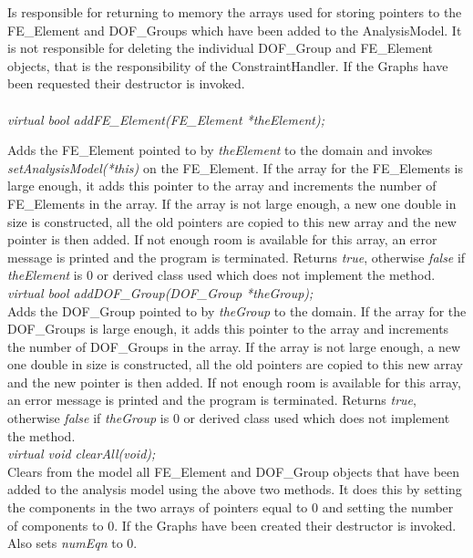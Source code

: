 Is responsible for returning to memory the arrays used for storing
pointers to the FE\_Element and DOF\_Groups which have been added to
the AnalysisModel. It is not responsible for deleting the individual
DOF\_Group and FE\_Element objects, that is the responsibility of the
ConstraintHandler. If the Graphs have been requested their destructor
is invoked.\\ 

  \\
{\em virtual bool addFE\_Element(FE\_Element *theElement);}  

Adds the FE\_Element pointed to by {\em theElement} to the domain and
invokes {\em setAnalysisModel(*this)} on the FE\_Element. If the
array for the FE\_Elements is large enough, it adds this pointer to
the array and increments the number of FE\_Elements in the array. If
the array is not large enough, a new one double in size is
constructed, all the old pointers are copied to this new array and the
new pointer is then added. If not enough room is available for this
array, an error message is printed and the program is
terminated. Returns {\em true}, otherwise {\em false} if {\em
theElement} is $0$ or derived class used which does not implement the
method. \\ 

{\em virtual bool addDOF\_Group(DOF\_Group *theGroup);}  \\
Adds the DOF\_Group pointed to by {\em theGroup} to the domain. If the
array for the DOF\_Groups is large enough, it adds this pointer to
the array and increments the number of DOF\_Groups in the array. If
the array is not large enough, a new one double in size is
constructed, all the old pointers are copied to this new array and the
new pointer is then added. If not enough room is available for this
array, an error message is printed and the program is
terminated. Returns {\em true}, otherwise {\em false} if {\em
theGroup} is $0$ or derived class used which does not implement the
method. \\ 



{\em virtual void clearAll(void);} \\
Clears from the model all FE\_Element and DOF\_Group objects that have
been added to the analysis model using the above two methods. It does
this by setting the components in the two arrays of pointers equal to
$0$ and setting the number of components to $0$. If the Graphs have
been created their destructor is invoked. Also sets {\em numEqn} to $0$. \\

